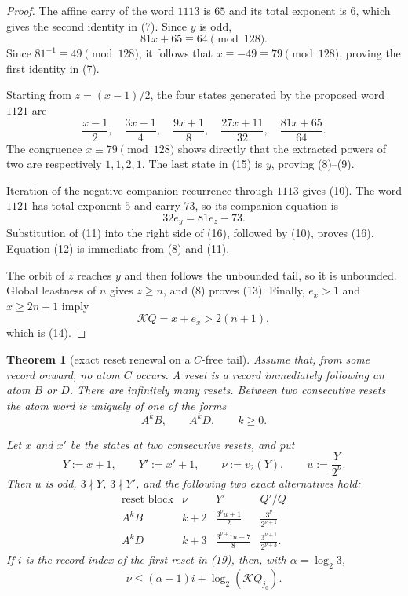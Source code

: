 \documentclass[11pt]{article}
\newtheorem{theorem}{Theorem}
\begin{document}
\begin{proof}
The affine carry of the word $1113$ is $65$ and its total exponent is
$6$, which gives the second identity in (7).  Since $y$ is odd,
\[
 81x+65\equiv64\pmod {128}.
\]
Since $81^{-1}\equiv49\pmod {128}$, it follows that
$x\equiv-49\equiv79\pmod {128}$, proving the first identity in (7).

Starting from $z=(x-1)/2$, the four states generated by the proposed word
$1121$ are
\[
 \frac{x-1}{2},
 \quad
 \frac{3x-1}{4},
 \quad
 \frac{9x+1}{8},
 \quad
 \frac{27x+11}{32},
 \quad
 \frac{81x+65}{64}.
 \tag{15}
\]
The congruence $x\equiv79\pmod {128}$ shows directly that the extracted
powers of two are respectively $1,1,2,1$.  The last state in (15) is
$y$, proving (8)--(9).

Iteration of the negative companion recurrence through $1113$ gives
(10).  The word $1121$ has total exponent $5$ and carry $73$, so its
companion equation is
\[
 32e_y=81e_z-73.
 \tag{16}
\]
Substitution of (11) into the right side of (16), followed by (10), proves
(16).  Equation (12) is immediate from (8) and (11).

The orbit of $z$ reaches $y$ and then follows the unbounded tail, so it is
unbounded.
Global leastness of $n$ gives $z\geq n$, and (8) proves (13).  Finally,
$e_x>1$ and $x\geq2n+1$ imply
\[
 \mathcal KQ=x+e_x>2(n+1),
\]
which is (14).
\end{proof}

\begin{theorem}[exact reset renewal on a $C$-free tail]
Assume that, from some record onward, no atom $C$ occurs.  A \emph{reset}
is a record immediately following an atom $B$ or $D$.  There are
infinitely many resets.  Between two consecutive resets the atom word is
uniquely of one of the forms
\[
 A^kB,
 \qquad
 A^kD,
 \qquad k\geq0.
 \tag{17}
\]

Let $x$ and $x'$ be the states at two consecutive resets, and put
\[
 Y:=x+1,
 \qquad
 Y':=x'+1,
 \qquad
 \nu:=v_2(Y),
 \qquad
 u:=\frac{Y}{2^\nu}.
 \tag{18}
\]
Then $u$ is odd, $3\nmid Y$, $3\nmid Y'$, and the following two exact
alternatives hold:
\[
\boxed{
\begin{array}{c|c|c|c}
\text{reset block}&\nu&Y'&Q'/Q\\ \hline
A^kB&k+2&\displaystyle\frac{3^\nu u+1}{2}
&\displaystyle\frac{3^\nu}{2^{\nu+1}}\\[8pt]
A^kD&k+3&\displaystyle\frac{3^{\nu+1}u+7}{8}
&\displaystyle\frac{3^{\nu+1}}{2^{\nu+3}}.
\end{array}}
\tag{19}
\]
If $i$ is the record index of the first reset in (19), then, with
$\alpha=\log_2 3$,
\[
\boxed{
 \nu\leq(\alpha-1)i+\log_2(\mathcal KQ_{j_0}).}
\tag{20}
\]
\end{theorem}
\end{document}
